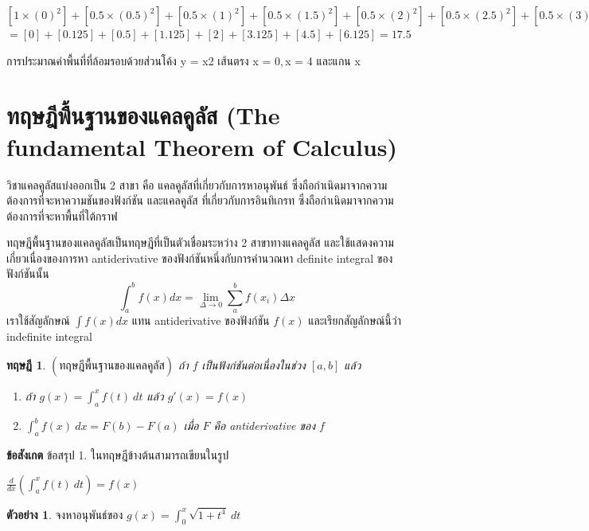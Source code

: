 \documentclass[
]{book}
\newtheorem{theorem}{ทฤษฎี}[chapter]
\theoremstyle{definition}
\theoremstyle{definition}
\newtheorem{example}{ตัวอย่าง}[chapter]
\theoremstyle{definition}
\theoremstyle{definition}
\theoremstyle{remark}
\begin{document}
\([1\times (0)^2]+[0.5\times (0.5)^2]+[0.5\times (1)^2]+ [0.5\times (1.5)^2]+ [0.5\times (2)^2]+ [0.5\times (2.5)^2]+ [0.5\times (3)^2]= [0.5\times (3.5)^2]\)\\
\(=[0]+[0.125]+[0.5]+[1.125]+[2]+[3.125]+[4.5]+[6.125]=17.5\)

การประมาณค่าพื้นที่ที่ล้อมรอบด้วยส่วนโค้ง {y = x2} เส้นตรง
{x = 0, x = 4} และแกน
{x}

\section{ทฤษฎีพื้นฐานของแคลคูลัส (The fundamental Theorem of Calculus)}\label{uxe17uxe24uxe29uxe0euxe1euxe19uxe10uxe32uxe19uxe02uxe2duxe07uxe41uxe04uxe25uxe04uxe25uxe2a-the-fundamental-theorem-of-calculus}

วิชาแคลคูลัสแบ่งออกเป็น 2 สาขา คือ แคลคูลัสที่เกี่ยวกับการหาอนุพันธ์
ซึ่งถือกำเนิดมาจากความต้องการที่จะหาความชันของฟังก์ชัน และแคลคูลัส ที่เกี่ยวกับการอินทิเกรท
ซึ่งถือกำเนิดมาจากความต้องการที่จะหาพื้นที่ใต้กราฟ

ทฤษฎีพื้นฐานของแคลคูลัสเป็นทฤษฎีที่เป็นตัวเชื่อมระหว่าง 2 สาขาทางแคลคูลัส
และใช้แสดงความเกี่ยวเนื่องของการหา antiderivative ของฟังก์ชันหนึ่งกับการคำนวณหา
definite integral ของฟังก์ชันนั้น
\[\int^b_af(x)dx= \lim\limits_{\Delta\rightarrow 0}\sum_a^bf(x_i)\Delta x\]
เราใช้สัญลักษณ์ \(\int f(x)dx\) แทน antiderivative ของฟังก์ชัน \(f(x)\)
และเรียกสัญลักษณ์นี้ว่า indefinite integral

\begin{theorem}

\(( \mbox{ทฤษฎีพื้นฐานของแคลคูลัส})\) ถ้า \(f\) เป็นฟังก์ชันต่อเนื่องในช่วง \([a,b]\) แล้ว

\begin{enumerate}
\def\labelenumi{\arabic{enumi}.}
\item
  ถ้า \(\displaystyle g(x)=\int_{a}^{x}f(t) \ dt\) แล้ว \(g'(x)=f(x)\)
\item
  \(\displaystyle \int_{a}^{b}f(x) \ dx=F(b)-F(a)\) เมื่อ \(F\) คือ
  antiderivative ของ \(f\)
\end{enumerate}

\end{theorem}

\textbf{ข้อสังเกต} ข้อสรุป 1. ในทฤษฎีข้างต้นสามารถเขียนในรูป

\(\displaystyle \frac{d}{dx}\left(\int_{a}^{x}f(t) \ dt\right)=f(x)\)

\begin{example}
จงหาอนุพันธ์ของ \(\displaystyle
g(x)=\int_{0}^{x}\sqrt{1+t^{4}} \ dt\)
\end{example}
\end{document}
